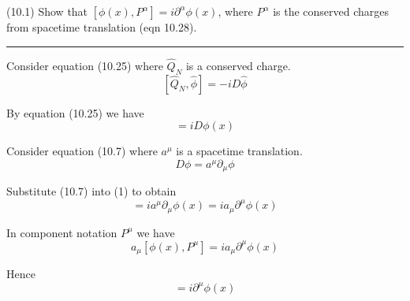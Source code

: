 \documentclass[12pt]{article}
\begin{document}
(10.1)
Show that $[\phi(x),P^\alpha]=i\partial^\alpha\phi(x)$, where $P^\alpha$ is
the conserved charges from spacetime translation
(eqn 10.28).

\bigskip
\hrule

\bigskip
Consider equation (10.25) where $\hat Q_N$ is a conserved charge.
\begin{equation*}
\left[\hat Q_N,\hat\phi\right]=-iD\hat\phi
\tag{10.25}
\end{equation*}

By equation (10.25) we have
\begin{equation*}
[\phi(x),P]=iD\phi(x)
\tag{1}
\end{equation*}

Consider equation (10.7) where $a^\mu$ is a spacetime translation.
\begin{equation*}
D\phi=a^\mu\partial_\mu\phi
\tag{10.7}
\end{equation*}

Substitute (10.7) into (1) to obtain
\begin{equation*}
[\phi(x),P]=ia^\mu\partial_\mu\phi(x)=ia_\mu\partial^\mu\phi(x)
\end{equation*}

In component notation $P^\mu$ we have
\begin{equation*}
a_\mu[\phi(x),P^\mu]=ia_\mu\partial^\mu\phi(x)
\end{equation*}

Hence
\begin{equation*}
[\phi(x),P^\mu]=i\partial^\mu\phi(x)
\end{equation*}
\end{document}
